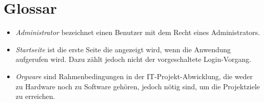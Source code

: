 \documentclass[a4paper,oneside,10pt]{scrreprt}
\begin{document}
\chapter{Glossar}

\begin{itemize}
\item \emph{Administrator} bezeichnet einen Benutzer mit dem Recht eines Administrators.

\item \emph{Startseite} ist die erste Seite die angezeigt wird, wenn die Anwendung aufgerufen wird. Dazu zählt jedoch nicht der vorgeschaltete Login-Vorgang.

\item \emph{Orgware} sind Rahmenbedingungen in der IT-Projekt-Abwicklung, die weder zu Hardware noch zu Software gehören, jedoch nötig sind, um die Projektziele zu erreichen.
\end{itemize}
\end{document}
